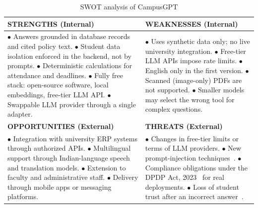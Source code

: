 \documentclass[11pt,a4paper,oneside]{report}
\begin{document}
\begin{table}[H]
\centering
\caption{SWOT analysis of CampusGPT}
\label{tab:swot}
\begin{tabularx}{\textwidth}{@{}Y|Y@{}}
\toprule
\textbf{STRENGTHS (Internal)} & \textbf{WEAKNESSES (Internal)}\\
\midrule
$\bullet$ Answers grounded in database records and cited policy text.\newline
$\bullet$ Student data isolation enforced in the backend, not by prompts.\newline
$\bullet$ Deterministic calculations for attendance and deadlines.\newline
$\bullet$ Fully free stack: open-source software, local embeddings, free-tier LLM API.\newline
$\bullet$ Swappable LLM provider through a single adapter. &
$\bullet$ Uses synthetic data only; no live university integration.\newline
$\bullet$ Free-tier LLM APIs impose rate limits.\newline
$\bullet$ English only in the first version.\newline
$\bullet$ Scanned (image-only) PDFs are not supported.\newline
$\bullet$ Smaller models may select the wrong tool for complex questions.\\
\midrule
\textbf{OPPORTUNITIES (External)} & \textbf{THREATS (External)}\\
\midrule
$\bullet$ Integration with university ERP systems through authorized APIs.\newline
$\bullet$ Multilingual support through Indian-language speech and translation models.\newline
$\bullet$ Extension to faculty and administrative staff.\newline
$\bullet$ Delivery through mobile apps or messaging platforms. &
$\bullet$ Changes in free-tier limits or terms of LLM providers.\newline
$\bullet$ New prompt-injection techniques~\cite{owasp2025llm}.\newline
$\bullet$ Compliance obligations under the DPDP Act, 2023~\cite{dpdp2023} for real
deployments.\newline
$\bullet$ Loss of student trust after an incorrect answer~\cite{ji2023hallucination}.\\
\bottomrule
\end{tabularx}
\end{table}
\end{document}
